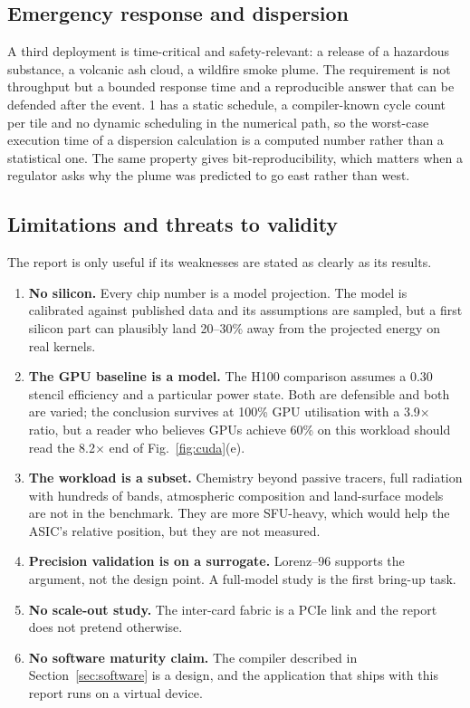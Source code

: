 \subsection{Emergency response and dispersion}
A third deployment is time-critical and safety-relevant: a release of a hazardous substance, a
volcanic ash cloud, a wildfire smoke plume. The requirement is not throughput but a bounded
response time and a reproducible answer that can be defended after the event. \ac{1} has a
static schedule, a compiler-known cycle count per tile and no dynamic scheduling in the numerical
path, so the worst-case execution time of a dispersion calculation is a computed number rather
than a statistical one. The same property gives bit-reproducibility, which matters when a
regulator asks why the plume was predicted to go east rather than west.

\subsection{Limitations and threats to validity}
The report is only useful if its weaknesses are stated as clearly as its results.

\begin{enumerate}[leftmargin=1.4em,itemsep=1pt]
\item \textbf{No silicon.} Every chip number is a model projection. The model is calibrated
      against published data and its assumptions are sampled, but a first silicon part can
      plausibly land 20--30\% away from the projected energy on real kernels.
\item \textbf{The GPU baseline is a model.} The H100 comparison assumes a 0.30 stencil efficiency
      and a particular power state. Both are defensible and both are varied; the conclusion
      survives at 100\% GPU utilisation with a 3.9$\times$ ratio, but a reader who believes GPUs
      achieve 60\% on this workload should read the 8.2$\times$ end of Fig.~\ref{fig:cuda}(e).
\item \textbf{The workload is a subset.} Chemistry beyond passive tracers, full radiation with
      hundreds of bands, atmospheric composition and land-surface models are not in the
      benchmark. They are more SFU-heavy, which would help the ASIC's relative position, but they
      are not measured.
\item \textbf{Precision validation is on a surrogate.} Lorenz--96 supports the argument, not the
      design point. A full-model study is the first bring-up task.
\item \textbf{No scale-out study.} The inter-card fabric is a PCIe link and the report does not
      pretend otherwise.
\item \textbf{No software maturity claim.} The compiler described in Section~\ref{sec:software}
      is a design, and the application that ships with this report runs on a virtual device.
\end{enumerate}

